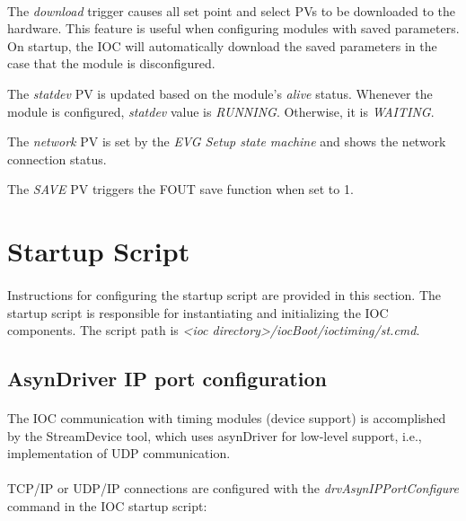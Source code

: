 \documentclass[openany]{article}
\begin{document}
			\paragraph{} The \emph{download} trigger causes all set point and select PVs to be downloaded to the hardware. This feature is useful when configuring modules with saved parameters. On startup, the IOC will automatically download the saved parameters in the case that the module is disconfigured.
			\par The \emph{statdev} PV is updated based on the module's \emph{alive} status. Whenever the module is configured, \emph{statdev} value is \emph{RUNNING}. Otherwise, it is \emph{WAITING}.
			\par The \emph{network} PV is set by the \emph{EVG Setup state machine} and shows the network connection status.
			\par The \emph{SAVE} PV triggers the FOUT save function when set to 1.

\section{Startup Script}\label{sec:startup-script}

	\paragraph{} Instructions for configuring the startup script are provided in this section. The startup script is responsible for instantiating and initializing the IOC components. The script path is \emph{\textless ioc directory\textgreater /iocBoot/ioctiming/st.cmd}.

	\subsection{AsynDriver IP port configuration}\label{sec:ip-port-config}

		\paragraph{} The IOC communication with timing modules (device support) is accomplished by the StreamDevice tool, which uses asynDriver for low-level support, i.e., implementation of UDP communication.
		\paragraph{} TCP/IP or UDP/IP connections are configured with the \emph{drvAsynIPPortConfigure} command in the IOC startup script:
\end{document}

